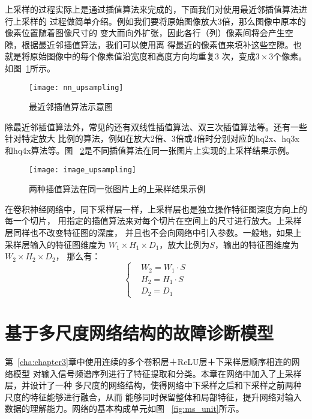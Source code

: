 上采样的过程实际上是通过插值算法来完成的，下面我们对使用最近邻插值算法进行上采样的
过程做简单介绍。例如我们要将原始图像放大3倍，那么图像中原本的像素位置随着图像尺寸的
变大而向外扩张，因此各行（列）像素间将会产生空隙，根据最近邻插值算法，我们可以使用离
得最近的像素值来填补这些空隙。也就是将原始图像中的每个像素值沿宽度和高度方向均重复3
次，变成$3\times 3$个像素。如图~\ref{fig:nn_upsampling}所示。
\begin{figure}[ht]
  \centering
  \texttt{[image: nn\_upsampling]}
  \caption{最近邻插值算法示意图}
  \label{fig:nn_upsampling}
\end{figure}

除最近邻插值算法外，常见的还有双线性插值算法、双三次插值算法等。还有一些针对特定放大
比例的算法，例如在放大2倍、3倍或4倍时分别对应的hq2x、hq3x和hq4x算法等。图
~\ref{fig:image_upsampling}是不同插值算法在同一张图片上实现的上采样结果示例。
\begin{figure}[ht]
  \centering
  \texttt{[image: image\_upsampling]}
  \caption{两种插值算法在同一张图片上的上采样结果示例}
  \label{fig:image_upsampling}
\end{figure}

在卷积神经网络中，同下采样层一样，上采样层也是独立操作特征图深度方向上的每一个切片，
用指定的插值算法来对每个切片在空间上的尺寸进行放大。上采样层同样也不改变特征图的深度，
并且也不会向网络中引入参数。一般地，如果上采样层输入的特征图维度为
$W_1\times H_1\times D_1$，放大比例为$S$，输出的特征图维度为$W_2\times H_2\times D_2$，
那么有：
\begin{equation}
  \label{equ:chap4:upsampling_dim}
  \left\{\begin{aligned}
    & W_2 = W_1 \cdot S \\
    & H_2 = H_1 \cdot S \\
    & D_2 = D_1
  \end{aligned}\right.
\end{equation}

\section{基于多尺度网络结构的故障诊断模型}

第~\ref{cha:chapter3}章中使用连续的多个卷积层＋ReLU层＋下采样层顺序相连的网络模型
对输入信号频谱序列进行了特征提取和分类。本章在网络中加入了上采样层，并设计了一种
多尺度的网络结构，使得网络中下采样之后和下采样之前两种尺度的特征能够进行融合，从而
能够同时保留整体和局部特征，提升网络对输入数据的理解能力。网络的基本构成单元如图
~\ref{fig:ms_unit}所示。

